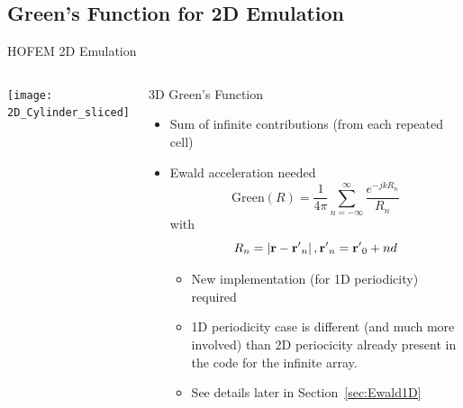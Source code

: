 %
%

\subsection{Green's Function for 2D Emulation}


\begin{frame}[allowframebreaks]{HOFEM 2D Emulation}

  \begin{columns}
     \centering
    {\texttt{[image: 2D\_Cylinder\_sliced]}}

     \centering
    \begin{block}{3D Green's Function}
      \begin{itemize}
      \item Sum of infinite contributions (from each repeated cell)
        
      \item Ewald acceleration needed 
        \begin{equation*}
          \text{Green}(R) = \dfrac{1}{4\pi}
          \sum_{n=-\infty}^\infty \dfrac{e^{-j k R_n}}{R_n}
        \end{equation*}
        with
        \begin{equation*}
          R_n=\left\lvert\mathbf{r}-\mathbf{r^\prime}_n\right\rvert, \mathbf{r^\prime}_n=\mathbf{r^\prime}_0 + n d
        \end{equation*}

        \begin{itemize}
        \item New implementation (for 1D periodicity) required
        \item 1D periodicity case is different (and much more
          involved) than 2D periocicity already present in the code
          for the infinite array.
        \item See details later in Section~\ref{sec:Ewald1D}
        \end{itemize}
      \end{itemize}
      

\end{block}
\end{columns}
\end{frame}
